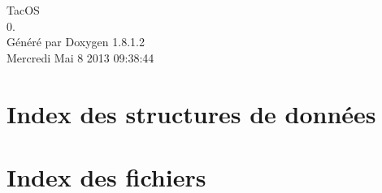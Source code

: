 \documentclass{book}
\begin{document}
\hypersetup{pageanchor=false,citecolor=blue}
\begin{titlepage}
\vspace*{7cm}
\begin{center}
{\Large Tac\-O\-S \\[1ex]\large 0. }\\
\vspace*{1cm}
{\large Généré par Doxygen 1.8.1.2}\\
\vspace*{0.5cm}
{\small Mercredi Mai 8 2013 09:38:44}\\
\end{center}
\end{titlepage}
\clearemptydoublepage
{}
\tableofcontents
\clearemptydoublepage
{}
\hypersetup{pageanchor=true,citecolor=blue}
\chapter{Index des structures de données}

\chapter{Index des fichiers}

\end{document}
